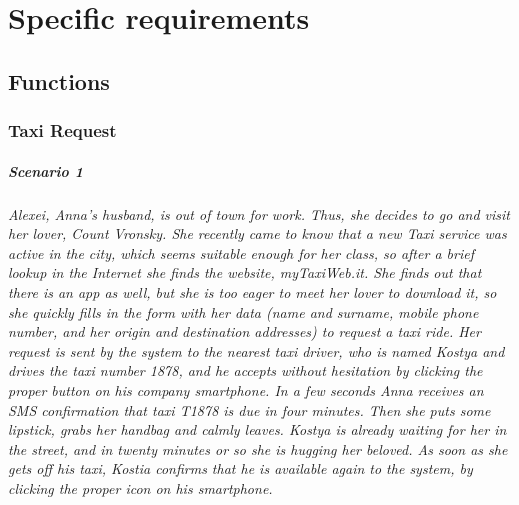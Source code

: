 \chapter{Specific requirements}

\section{Functions}

\subsection{Taxi Request}


\paragraph{Scenario 1}\begin{fullwidth}\small\itshape Alexei, Anna's husband, is out of town for work. Thus, she decides to go and visit her lover, Count Vronsky. She recently came to know that a new Taxi service was active in the city, which seems suitable enough for her class, so after a brief lookup in the Internet she finds the website, myTaxiWeb.it. She finds out that there is an app as well, but she is too eager to meet her lover to download it, so she quickly fills in the form with her data (name and surname, mobile phone number, and her origin and destination addresses) to request a taxi ride. Her request is sent by the system to the nearest taxi driver, who is named Kostya and drives the taxi number 1878, and he accepts without hesitation by clicking the proper button on his company smartphone. In a few seconds Anna receives an SMS confirmation that taxi T1878 is due in four minutes. Then she puts some lipstick, grabs her handbag and calmly leaves. Kostya is already waiting for her in the street, and in twenty minutes or so she is hugging her beloved. As soon as she gets off his taxi, Kostia confirms that he is available again to the system, by clicking the proper icon on his smartphone.\end{fullwidth}


